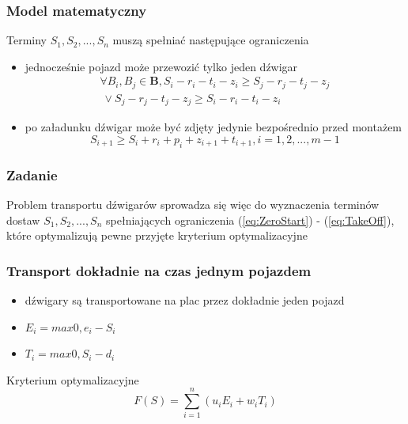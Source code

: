 \documentclass{beamer}
\begin{document}
 \begin{frame}
 \frametitle{Model matematyczny}
 
 \begin{block}{Terminy $S_1, S_2,...,S_n $ muszą spełniać następujące ograniczenia}
 \begin{itemize}
       \item jednocześnie pojazd może przewozić tylko jeden dźwigar
     \begin{equation}\label{eq:OneVehicle}
     \begin{split}
      \forall B_i, B_j \in \textbf{B}, S_i - r_i - t_i - z_i \ge S_j - r_j - t_j - z_j
      \\ \   \vee S_j - r_j - t_j - z_j \ge S_i - r_i - t_i - z_i
     \end{split}
     \end{equation}
     \item po załadunku dźwigar może być zdjęty jedynie bezpośrednio przed montażem
      \begin{equation}\label{eq:TakeOff}
      S_{i+1} \ge S_i + r_i + p_i + z_{i+1} + t_{i+1}, i = 1,2,...,m-1
      \end{equation}        
 \end{itemize}
 \end{block}
\end{frame}

\begin{frame}
 \frametitle{Zadanie}
 \begin{block}{}
 Problem transportu dźwigarów sprowadza się więc do wyznaczenia terminów dostaw $S_1, S_2,...,S_n $ spełniających ograniczenia (\ref{eq:ZeroStart})
 - (\ref{eq:TakeOff}), które optymalizują pewne przyjęte kryterium optymalizacyjne
  
 \end{block}
\end{frame}


\begin{frame}
 \frametitle{Transport dokładnie na czas jednym pojazdem}
 \begin{itemize}
  \item dźwigary są transportowane na plac przez dokładnie jeden pojazd
 \end{itemize}
 \begin{block}{}
 \begin{itemize}
 \item $ E_i = max{0, e_i - S_i} $ 
 \item $ T_i = max{0, S_i - d_i} $
 \end{itemize}
 \end{block}
 
 \begin{block}{Kryterium optymalizacyjne}
  \begin{equation}
   F(S) = \sum_{i=1}^{n}(u_iE_i + w_iT_i) 
  \end{equation}
 \end{block}

\end{frame}
\end{document}

